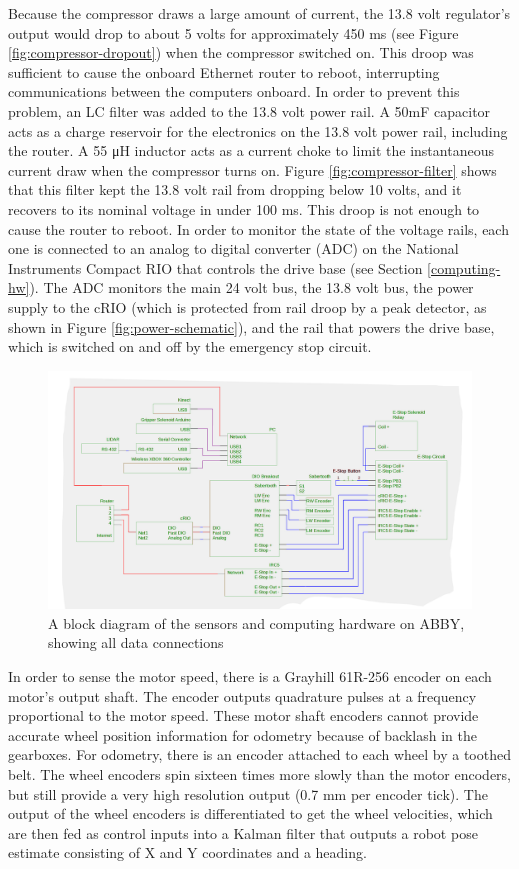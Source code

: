 \documentclass[]{cwru} %
\begin{document}
Because the compressor draws a large amount of current, the 13.8 volt
regulator's output would drop to about 5 volts for approximately 450 ms
(see Figure \ref{fig:compressor-dropout}) when the compressor switched on. This droop was
sufficient to cause the onboard Ethernet router to reboot, interrupting
communications between the computers onboard. In order to prevent this
problem, an LC filter was added to the 13.8 volt power rail. A 50mF
capacitor acts as a charge reservoir for the electronics on the 13.8
volt power rail, including the router. A 55 μH inductor acts as a
current choke to limit the instantaneous current draw when the
compressor turns on. Figure \ref{fig:compressor-filter} shows that this filter kept the 13.8 volt
rail from dropping below 10 volts, and it recovers to its nominal
voltage in under 100 ms. This droop is not enough to cause the router to
reboot. In order to monitor the state of the voltage rails, each one is
connected to an analog to digital converter (ADC) on the National
Instruments Compact RIO that controls the drive base (see Section \ref{computing-hw}).
The ADC monitors the main 24 volt bus, the 13.8 volt bus, the power
supply to the cRIO (which is protected from rail droop by a peak
detector, as shown in Figure \ref{fig:power-schematic}), and the rail that powers the drive
base, which is switched on and off by the emergency stop circuit.

\begin{figure}[ht]
\centering
\includegraphics[width=6.0in]{data_block_diagram}
\caption{A block diagram of the sensors and computing hardware on ABBY, 
showing all data connections}
\label{fig:data-schematic}
\end{figure}

In order to sense the motor speed, there is a Grayhill 61R-256 encoder
on each motor's output shaft. The encoder outputs quadrature pulses at a
frequency proportional to the motor speed. These motor shaft encoders
cannot provide accurate wheel position information for odometry because
of backlash in the gearboxes. For odometry, there is an encoder attached
to each wheel by a toothed belt. The wheel encoders spin sixteen times
more slowly than the motor encoders, but still provide a very high
resolution output (0.7 mm per encoder tick). The output of the wheel
encoders is differentiated to get the wheel velocities, which are then
fed as control inputs into a Kalman filter that outputs a robot pose
estimate consisting of X and Y coordinates and a heading.
\end{document}
